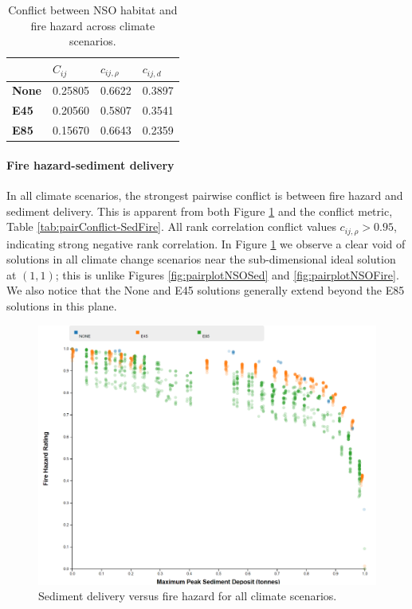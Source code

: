 \begin{table}[]
\centering
\caption[NSO-fire hazard conflict across climate scenarios]{Conflict between NSO habitat and fire hazard across climate scenarios.}
\label{tab:pairConflict-NSOFire}
\begin{tabular}{llll}
\textbf{}     & \textbf{$C_{ij}$} & \textbf{$c_{ij,\rho}$} & \textbf{$c_{ij,d}$} \\ \hline
\textbf{None} & 0.25805           & 0.6622                 & 0.3897              \\
\textbf{E45}  & 0.20560           & 0.5807                 & 0.3541              \\
\textbf{E85}  & 0.15670           & 0.6643                 & 0.2359
\end{tabular}
\end{table}

\paragraph{Fire hazard-sediment delivery}
In all climate scenarios, the strongest pairwise conflict is between fire hazard and sediment delivery. This is apparent from both Figure \ref{fig:pairplotSedFire} and the conflict metric, Table \ref{tab:pairConflict-SedFire}. All rank correlation conflict values $c_{ij,\rho} > 0.95$, indicating strong negative rank correlation. In Figure \ref{fig:pairplotSedFire} we observe a clear void of solutions in all climate change scenarios near the sub-dimensional ideal solution at $(1,1)$; this is unlike Figures \ref{fig:pairplotNSOSed} and \ref{fig:pairplotNSOFire}. We also notice that the None and E45 solutions generally extend beyond the E85 solutions in this plane.

\begin{figure}[ht]
\centering
\includegraphics[width=.75\textwidth]{../images/2DSlice_Sed_Fire}
\caption[Sediment delivery vs. fire hazard for all climate scenarios]{Sediment delivery versus fire hazard for all climate scenarios.}
\label{fig:pairplotSedFire}
\end{figure}

